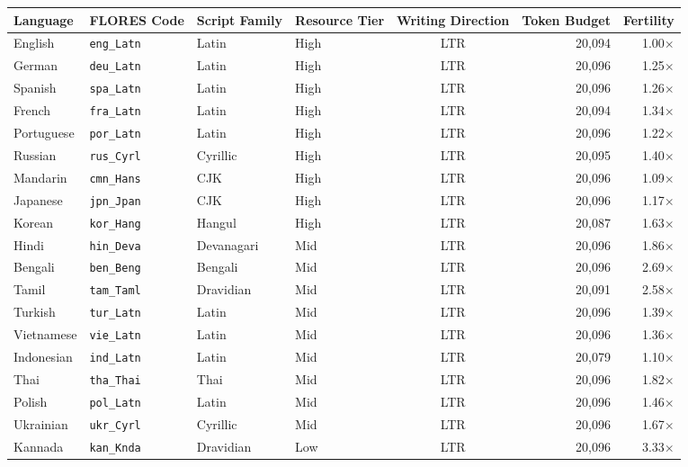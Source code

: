 \documentclass[11pt]{article}
\begin{document}
\begin{center}
\centering
\scriptsize
\setlength{\tabcolsep}{3pt}
\renewcommand{\arraystretch}{0.72}
\begin{tabularx}{\textwidth}{llllcrr}
\toprule
\textbf{Language} & \textbf{FLORES Code} & \textbf{Script Family} & \textbf{Resource Tier} & \textbf{Writing Direction} & \textbf{Token Budget} & \textbf{Fertility} \\
\midrule
English & \texttt{eng\_Latn} & Latin & High & LTR & 20,094 & 1.00$\times$ \\
German & \texttt{deu\_Latn} & Latin & High & LTR & 20,096 & 1.25$\times$ \\
Spanish & \texttt{spa\_Latn} & Latin & High & LTR & 20,096 & 1.26$\times$ \\
French & \texttt{fra\_Latn} & Latin & High & LTR & 20,094 & 1.34$\times$ \\
Portuguese & \texttt{por\_Latn} & Latin & High & LTR & 20,096 & 1.22$\times$ \\
Russian & \texttt{rus\_Cyrl} & Cyrillic & High & LTR & 20,095 & 1.40$\times$ \\
Mandarin & \texttt{cmn\_Hans} & CJK & High & LTR & 20,096 & 1.09$\times$ \\
Japanese & \texttt{jpn\_Jpan} & CJK & High & LTR & 20,096 & 1.17$\times$ \\
Korean & \texttt{kor\_Hang} & Hangul & High & LTR & 20,087 & 1.63$\times$ \\
\midrule
Hindi & \texttt{hin\_Deva} & Devanagari & Mid & LTR & 20,096 & 1.86$\times$ \\
Bengali & \texttt{ben\_Beng} & Bengali & Mid & LTR & 20,096 & 2.69$\times$ \\
Tamil & \texttt{tam\_Taml} & Dravidian & Mid & LTR & 20,091 & 2.58$\times$ \\
Turkish & \texttt{tur\_Latn} & Latin & Mid & LTR & 20,096 & 1.39$\times$ \\
Vietnamese & \texttt{vie\_Latn} & Latin & Mid & LTR & 20,096 & 1.36$\times$ \\
Indonesian & \texttt{ind\_Latn} & Latin & Mid & LTR & 20,079 & 1.10$\times$ \\
Thai & \texttt{tha\_Thai} & Thai & Mid & LTR & 20,096 & 1.82$\times$ \\
Polish & \texttt{pol\_Latn} & Latin & Mid & LTR & 20,096 & 1.46$\times$ \\
Ukrainian & \texttt{ukr\_Cyrl} & Cyrillic & Mid & LTR & 20,096 & 1.67$\times$ \\
\midrule
Kannada & \texttt{kan\_Knda} & Dravidian & Low & LTR & 20,096 & 3.33$\times$ \\

\end{tabularx}
\end{center}
\end{document}

